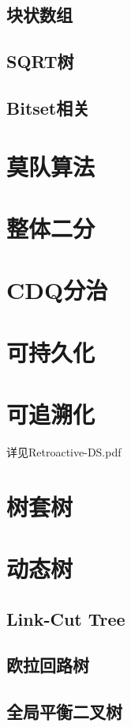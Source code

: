 \documentclass[12pt,a4paper]{article}
\begin{document}
\subsection{块状数组} %
\subsection{SQRT树}
\subsection{Bitset相关}

\newpage
\section{莫队算法}

\newpage
\section{整体二分}

\newpage
\section{CDQ分治}

\newpage
\section{可持久化}

\newpage
\section{可追溯化}
详见Retroactive-DS.pdf

\newpage
\section{树套树}

\newpage
\section{动态树}
\subsection{Link-Cut Tree}
\subsection{欧拉回路树}
\subsection{全局平衡二叉树}
\end{document}
